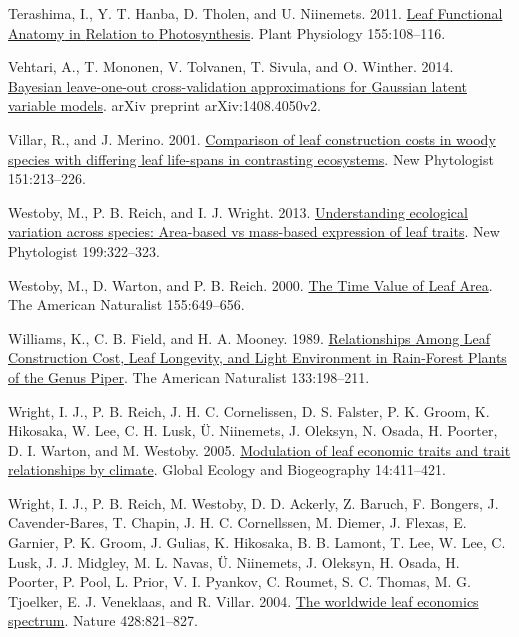 \documentclass[
  12pt,
]{article}
\newlength{\cslhangindent}
\newlength{\cslentryspacingunit} %
\newenvironment{CSLReferences}[2] %
 {%
  \setlength{\parindent}{0pt}
  \ifodd #1
  \let\oldpar\par
  \def\par{\hangindent=\cslhangindent\oldpar}
  \fi
  \setlength{\parskip}{#2\cslentryspacingunit}
 }%
 {}
\begin{document}
\begin{CSLReferences}{1}{0}
\leavevmode{}%
Terashima, I., Y. T. Hanba, D. Tholen, and U. Niinemets. 2011. \href{https://doi.org/10.1104/pp.110.165472}{Leaf {Functional Anatomy} in {Relation} to {Photosynthesis}}. Plant Physiology 155:108--116.

\leavevmode{}%
Vehtari, A., T. Mononen, V. Tolvanen, T. Sivula, and O. Winther. 2014. \href{https://arxiv.org/abs/1408.4050v2}{Bayesian leave-one-out cross-validation approximations for {Gaussian} latent variable models}. arXiv preprint arXiv:1408.4050v2.

\leavevmode{}%
Villar, R., and J. Merino. 2001. \href{https://doi.org/10.1046/j.1469-8137.2001.00147.x}{Comparison of leaf construction costs in woody species with differing leaf life-spans in contrasting ecosystems}. New Phytologist 151:213--226.

\leavevmode{}%
Westoby, M., P. B. Reich, and I. J. Wright. 2013. \href{https://doi.org/10.1111/nph.12345}{Understanding ecological variation across species: Area-based vs mass-based expression of leaf traits}. New Phytologist 199:322--323.

\leavevmode{}%
Westoby, M., D. Warton, and P. B. Reich. 2000. \href{https://doi.org/10.1086/303346}{The {Time Value} of {Leaf Area}}. The American Naturalist 155:649--656.

\leavevmode{}%
Williams, K., C. B. Field, and H. A. Mooney. 1989. \href{https://doi.org/10.1086/284910}{Relationships {Among Leaf Construction Cost}, {Leaf Longevity}, and {Light Environment} in {Rain}-{Forest Plants} of the {Genus Piper}}. The American Naturalist 133:198--211.

\leavevmode{}%
Wright, I. J., P. B. Reich, J. H. C. Cornelissen, D. S. Falster, P. K. Groom, K. Hikosaka, W. Lee, C. H. Lusk, Ü. Niinemets, J. Oleksyn, N. Osada, H. Poorter, D. I. Warton, and M. Westoby. 2005. \href{https://doi.org/10.1111/j.1466-822x.2005.00172.x}{Modulation of leaf economic traits and trait relationships by climate}. Global Ecology and Biogeography 14:411--421.

\leavevmode{}%
Wright, I. J., P. B. Reich, M. Westoby, D. D. Ackerly, Z. Baruch, F. Bongers, J. Cavender-Bares, T. Chapin, J. H. C. Cornellssen, M. Diemer, J. Flexas, E. Garnier, P. K. Groom, J. Gulias, K. Hikosaka, B. B. Lamont, T. Lee, W. Lee, C. Lusk, J. J. Midgley, M. L. Navas, Ü. Niinemets, J. Oleksyn, H. Osada, H. Poorter, P. Pool, L. Prior, V. I. Pyankov, C. Roumet, S. C. Thomas, M. G. Tjoelker, E. J. Veneklaas, and R. Villar. 2004. \href{https://doi.org/10.1038/nature02403}{The worldwide leaf economics spectrum}. Nature 428:821--827.


\end{CSLReferences}
\end{document}
